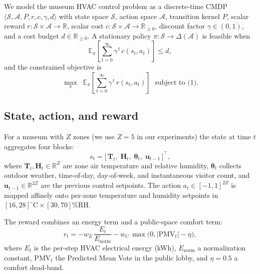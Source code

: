 \documentclass[11pt,a4paper]{article}
\begin{document}
We model the museum HVAC control problem as a discrete-time CMDP
$\langle\mathcal{S},\mathcal{A},P,r,c,\gamma,d\rangle$ with state space
$\mathcal{S}$, action space $\mathcal{A}$, transition kernel $P$, scalar
reward $r:\mathcal{S}\times\mathcal{A}\to\mathbb{R}$, scalar cost
$c:\mathcal{S}\times\mathcal{A}\to\mathbb{R}_{\ge 0}$, discount factor
$\gamma\in(0,1)$, and a cost budget $d\in\mathbb{R}_{\ge 0}$. A
stationary policy $\pi:\mathcal{S}\to\Delta(\mathcal{A})$ is feasible
when
\begin{equation}
\mathbb{E}_{\pi}\!\left[\sum_{t=0}^\infty \gamma^{\,t}\, c(s_t,a_t)\right]
\le d,
\label{eq:cmdp_constraint}
\end{equation}
and the constrained objective is
\begin{equation}
\max_{\pi}\;\;\mathbb{E}_{\pi}\!\left[\sum_{t=0}^\infty \gamma^{\,t}\, r(s_t,a_t)\right]
\;\text{ subject to (1).}
\label{eq:cmdp_objective}
\end{equation}

\subsection{State, action, and reward}\label{sec:state_action_reward}

For a museum with $Z$ zones (we use $Z=5$ in our experiments) the state
at time $t$ aggregates four blocks:
\begin{equation}
s_t = \big[\,\mathbf{T}_t,\;\mathbf{H}_t,\;\boldsymbol{\theta}_t,\;
            \boldsymbol{u}_{t-1}\,\big]^{\top},
\label{eq:state}
\end{equation}
where $\mathbf{T}_t,\mathbf{H}_t\in\mathbb{R}^{Z}$ are zone air
temperature and relative humidity, $\boldsymbol{\theta}_t$ collects
outdoor weather, time-of-day, day-of-week, and instantaneous visitor
count, and $\boldsymbol{u}_{t-1}\in\mathbb{R}^{2Z}$ are the previous
control setpoints. The action $a_t\in[-1,1]^{2Z}$ is mapped affinely
onto per-zone temperature and humidity setpoints in
$[16,28]^\circ\mathrm{C}\times[30,70]\%\mathrm{RH}$.

The reward combines an energy term and a public-space comfort term:
\begin{equation}
r_t = -w_E\,\frac{E_t}{E_{\mathrm{norm}}} - w_C\,\max\big(0,|\mathrm{PMV}_t|-\eta\big),
\label{eq:reward}
\end{equation}
where $E_t$ is the per-step HVAC electrical energy (kWh),
$E_{\mathrm{norm}}$ a normalization constant, $\mathrm{PMV}_t$ the
Predicted Mean Vote in the public lobby, and $\eta=0.5$ a comfort
dead-band.
\end{document}
